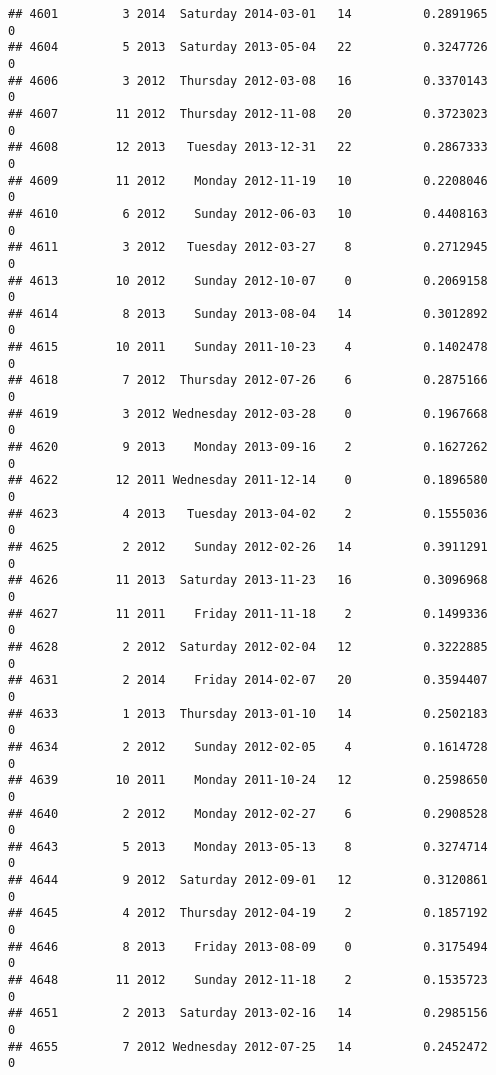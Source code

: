 \documentclass[
]{article}
\begin{document}
\begin{verbatim}
## 4601         3 2014  Saturday 2014-03-01   14          0.2891965             0
## 4604         5 2013  Saturday 2013-05-04   22          0.3247726             0
## 4606         3 2012  Thursday 2012-03-08   16          0.3370143             0
## 4607        11 2012  Thursday 2012-11-08   20          0.3723023             0
## 4608        12 2013   Tuesday 2013-12-31   22          0.2867333             0
## 4609        11 2012    Monday 2012-11-19   10          0.2208046             0
## 4610         6 2012    Sunday 2012-06-03   10          0.4408163             0
## 4611         3 2012   Tuesday 2012-03-27    8          0.2712945             0
## 4613        10 2012    Sunday 2012-10-07    0          0.2069158             0
## 4614         8 2013    Sunday 2013-08-04   14          0.3012892             0
## 4615        10 2011    Sunday 2011-10-23    4          0.1402478             0
## 4618         7 2012  Thursday 2012-07-26    6          0.2875166             0
## 4619         3 2012 Wednesday 2012-03-28    0          0.1967668             0
## 4620         9 2013    Monday 2013-09-16    2          0.1627262             0
## 4622        12 2011 Wednesday 2011-12-14    0          0.1896580             0
## 4623         4 2013   Tuesday 2013-04-02    2          0.1555036             0
## 4625         2 2012    Sunday 2012-02-26   14          0.3911291             0
## 4626        11 2013  Saturday 2013-11-23   16          0.3096968             0
## 4627        11 2011    Friday 2011-11-18    2          0.1499336             0
## 4628         2 2012  Saturday 2012-02-04   12          0.3222885             0
## 4631         2 2014    Friday 2014-02-07   20          0.3594407             0
## 4633         1 2013  Thursday 2013-01-10   14          0.2502183             0
## 4634         2 2012    Sunday 2012-02-05    4          0.1614728             0
## 4639        10 2011    Monday 2011-10-24   12          0.2598650             0
## 4640         2 2012    Monday 2012-02-27    6          0.2908528             0
## 4643         5 2013    Monday 2013-05-13    8          0.3274714             0
## 4644         9 2012  Saturday 2012-09-01   12          0.3120861             0
## 4645         4 2012  Thursday 2012-04-19    2          0.1857192             0
## 4646         8 2013    Friday 2013-08-09    0          0.3175494             0
## 4648        11 2012    Sunday 2012-11-18    2          0.1535723             0
## 4651         2 2013  Saturday 2013-02-16   14          0.2985156             0
## 4655         7 2012 Wednesday 2012-07-25   14          0.2452472             0

\end{verbatim}
\end{document}
